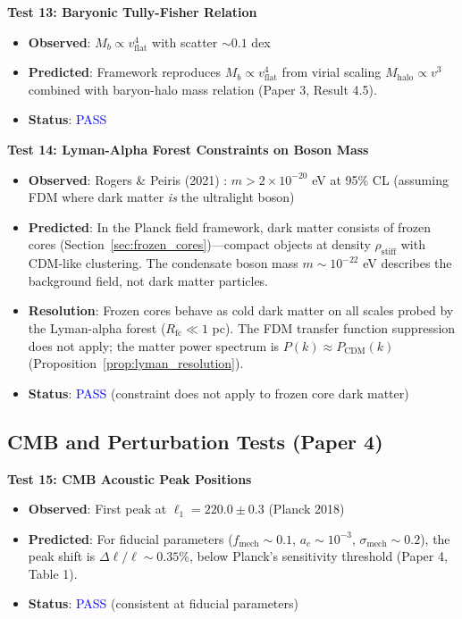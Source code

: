 \documentclass[11pt,a4paper]{article}
\newcommand{\rhostiff}{\ensuremath{\rho_{\mathrm{stiff}}}}
\theoremstyle{definition}
\theoremstyle{remark}
\begin{document}
\textbf{Test 13: Baryonic Tully-Fisher Relation}

\begin{itemize}[leftmargin=*, itemsep=0.1em]
\item \textbf{Observed}: $M_b \propto v_{\mathrm{flat}}^4$ with scatter $\sim 0.1$ dex \cite{McGaugh2000}
\item \textbf{Predicted}: Framework reproduces $M_b \propto v_{\mathrm{flat}}^4$ from virial scaling $M_{\mathrm{halo}} \propto v^3$ combined with baryon-halo mass relation (Paper 3, Result 4.5).
\item \textbf{Status}: \textcolor{blue}{PASS}
\end{itemize}

\textbf{Test 14: Lyman-Alpha Forest Constraints on Boson Mass}

\begin{itemize}[leftmargin=*, itemsep=0.1em]
\item \textbf{Observed}: Rogers \& Peiris (2021) \cite{RogersPeiris2021}: $m > 2 \times 10^{-20}$ eV at 95\% CL (assuming FDM where dark matter \emph{is} the ultralight boson)
\item \textbf{Predicted}: In the Planck field framework, dark matter consists of frozen cores (Section~\ref{sec:frozen_cores})---compact objects at density $\rhostiff$ with CDM-like clustering. The condensate boson mass $m \sim 10^{-22}$ eV describes the background field, not dark matter particles.
\item \textbf{Resolution}: Frozen cores behave as cold dark matter on all scales probed by the Lyman-alpha forest ($R_{\mathrm{fc}} \ll 1$ pc). The FDM transfer function suppression does not apply; the matter power spectrum is $P(k) \approx P_{\mathrm{CDM}}(k)$ (Proposition~\ref{prop:lyman_resolution}).
\item \textbf{Status}: \textcolor{blue}{PASS} (constraint does not apply to frozen core dark matter)
\end{itemize}

\subsection{CMB and Perturbation Tests (Paper 4)}
\label{sec:tests_cmb}

\textbf{Test 15: CMB Acoustic Peak Positions}

\begin{itemize}[leftmargin=*, itemsep=0.1em]
\item \textbf{Observed}: First peak at $\ell_1 = 220.0 \pm 0.3$ (Planck 2018) \cite{Planck2018}
\item \textbf{Predicted}: For fiducial parameters ($f_{\mathrm{mech}} \sim 0.1$, $a_c \sim 10^{-3}$, $\sigma_{\mathrm{mech}} \sim 0.2$), the peak shift is $\Delta\ell/\ell \sim 0.35\%$, below Planck's sensitivity threshold (Paper 4, Table 1).
\item \textbf{Status}: \textcolor{blue}{PASS} (consistent at fiducial parameters)
\end{itemize}
\end{document}
